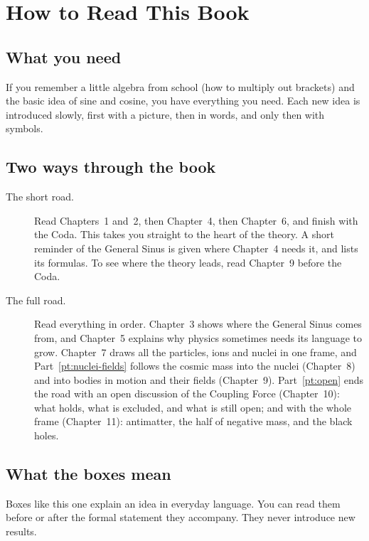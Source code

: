 \chapter*{How to Read This Book}

\section*{What you need}
If you remember a little algebra from school (how to multiply out brackets) and the basic idea of sine and cosine, you have everything you need. Each new idea is introduced slowly, first with a picture, then in words, and only then with symbols.

\section*{Two ways through the book}
\begin{description}
  \item[The short road.] Read Chapters~1 and~2, then Chapter~4, then Chapter~6, and finish with the Coda. This takes you straight to the heart of the theory. A short reminder of the General Sinus is given where Chapter~4 needs it, and  lists its formulas. To see where the theory leads, read Chapter~9 before the Coda.
  \item[The full road.] Read everything in order. Chapter~3 shows where the General Sinus comes from, and Chapter~5 explains why physics sometimes needs its language to grow. Chapter~7 draws all the particles, ions and nuclei in one frame, and Part~\ref{pt:nuclei-fields} follows the cosmic mass into the nuclei (Chapter~8) and into bodies in motion and their fields (Chapter~9). Part~\ref{pt:open} ends the road with an open discussion of the Coupling Force (Chapter~10): what holds, what is excluded, and what is still open; and with the whole frame (Chapter~11): antimatter, the half of negative mass, and the black holes.
\end{description}

\section*{What the boxes mean}
\begin{plainwords}
Boxes like this one explain an idea in everyday language. You can read them before or after the formal statement they accompany. They never introduce new results.
\end{plainwords}

